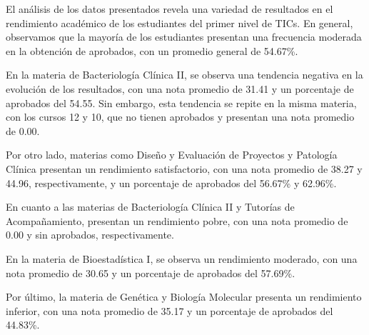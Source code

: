 El análisis de los datos presentados revela una variedad de resultados en el rendimiento académico de los estudiantes del primer nivel de TICs. En general, observamos que la mayoría de los estudiantes presentan una frecuencia moderada en la obtención de aprobados, con un promedio general de 54.67\%.

En la materia de Bacteriología Clínica II, se observa una tendencia negativa en la evolución de los resultados, con una nota promedio de 31.41 y un porcentaje de aprobados del 54.55. Sin embargo, esta tendencia se repite en la misma materia, con los cursos 12 y 10, que no tienen aprobados y presentan una nota promedio de 0.00.

Por otro lado, materias como Diseño y Evaluación de Proyectos y Patología Clínica presentan un rendimiento satisfactorio, con una nota promedio de 38.27 y 44.96, respectivamente, y un porcentaje de aprobados del 56.67\% y 62.96\%.

En cuanto a las materias de Bacteriología Clínica II y Tutorías de Acompañamiento, presentan un rendimiento pobre, con una nota promedio de 0.00 y sin aprobados, respectivamente.

En la materia de Bioestadística I, se observa un rendimiento moderado, con una nota promedio de 30.65 y un porcentaje de aprobados del 57.69\%.

Por último, la materia de Genética y Biología Molecular presenta un rendimiento inferior, con una nota promedio de 35.17 y un porcentaje de aprobados del 44.83\%.

